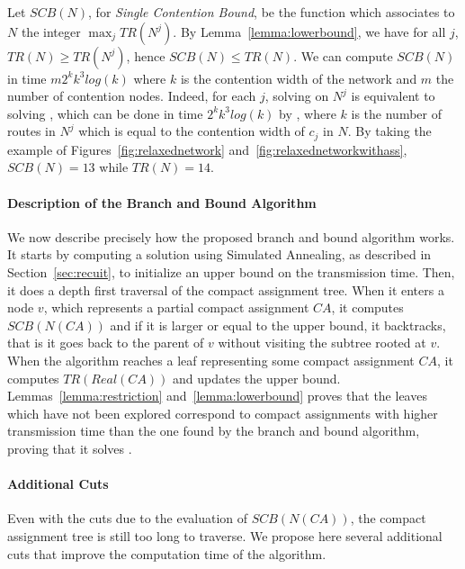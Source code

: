 Let $SCB(N)$, for \emph{Single Contention Bound}, be the function which associates to $N$ the integer 
$\max_{j} TR(N^j)$. By Lemma~\ref{lemma:lowerbound}, we have for all $j$, $TR(N) \geq TR(N^j)$, hence $SCB(N)\leq TR(N)$.
We can compute $SCB(N)$ in time $m2^kk^3log(k)$ where $k$ is the contention width of the network and $m$ the number 
of contention nodes. Indeed, for each $j$, solving \minstra on $N^j$ is equivalent to solving \wta, which can be done
in time $2^kk^3log(k)$ by \ASPMLS, where $k$ is the number of routes in $N^j$ which is equal to the contention width of $c_j$ in $N$. By taking the example of Figures~\ref{fig:relaxednetwork} and~\ref{fig:relaxednetworkwithass}, $SCB(N) = 13$ while $TR(N) = 14$.
\paragraph{Description of the Branch and Bound Algorithm}

We now describe precisely how the proposed branch and bound algorithm works.
It starts by computing a solution using Simulated Annealing, as described in Section~\ref{sec:recuit},
to initialize an upper bound on the transmission time.
Then, it does a depth first traversal of the compact assignment tree. 
When it enters a node $v$, which represents a partial compact assignment $CA$, it computes $SCB(N(CA))$ and
if it is larger or equal to the upper bound, it backtracks, that is it goes back to the parent of $v$ without visiting
the subtree rooted at $v$. 
When the algorithm reaches a leaf representing some compact assignment $CA$, it computes $TR(Real(CA))$ and updates the upper bound. Lemmas~\ref{lemma:restriction} and~\ref{lemma:lowerbound} proves that the leaves which have not been explored correspond to compact assignments with higher transmission time than the one found by the branch and bound algorithm, proving that it solves \minstra.


\paragraph{Additional Cuts}

Even with the cuts due to the evaluation of $SCB(N(CA))$, the compact assignment tree  is still too long to traverse. We propose here several additional cuts that improve the computation time of the algorithm. 


